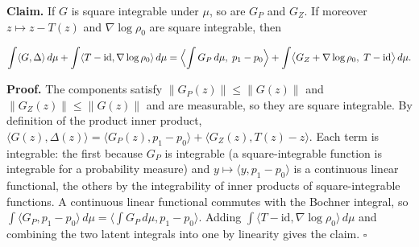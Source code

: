 \documentclass[11pt,a4paper]{report}
\begin{document}
\textbf{Claim.} If \(G\) is square integrable under \(\mu\), so are \(G_P\) and \(G_Z\). If moreover \(z\mapsto z-T(z)\) and \(\nabla\log\rho_0\) are square integrable, then


\[\int\langle G,\Delta\rangle\,d\mu+\int\langle T-\mathrm{id},\nabla\log\rho_0\rangle\,d\mu=\Bigl\langle\int G_P\,d\mu,\;p_1-p_0\Bigr\rangle+\int\bigl\langle G_Z+\nabla\log\rho_0,\;T-\mathrm{id}\bigr\rangle\,d\mu.\]


\textbf{Proof.} The components satisfy \(\|G_P(z)\|\le\|G(z)\|\) and \(\|G_Z(z)\|\le\|G(z)\|\) and are measurable, so they are square integrable. By definition of the product inner product, \(\langle G(z),\Delta(z)\rangle=\langle G_P(z),p_1-p_0\rangle+\langle G_Z(z),T(z)-z\rangle\). Each term is integrable: the first because \(G_P\) is integrable (a square-integrable function is integrable for a probability measure) and \(y\mapsto\langle y,p_1-p_0\rangle\) is a continuous linear functional, the others by the integrability of inner products of square-integrable functions. A continuous linear functional commutes with the Bochner integral, so \(\int\langle G_P,p_1-p_0\rangle\,d\mu=\langle\int G_P\,d\mu,p_1-p_0\rangle\). Adding \(\int\langle T-\mathrm{id},\nabla\log\rho_0\rangle\,d\mu\) and combining the two latent integrals into one by linearity gives the claim. \(\square\)
\end{document}
